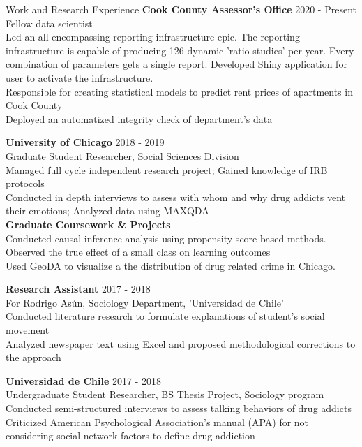 \documentclass{resume} %
\begin{document}
\begin{rSection}{Work and Research Experience}
{\textbf{Cook County Assessor's Office}}  \hfill 2020 - Present\\
Fellow data scientist\\
Led an all-encompassing reporting infrastructure epic. The reporting infrastructure is capable of producing 126 dynamic 'ratio studies' per year. Every combination of parameters gets a single report. Developed Shiny application for user to activate the infrastructure.\\
Responsible for creating statistical models to predict rent prices of apartments in Cook County\\
Deployed an automatized integrity check of department's data

{\textbf{University of Chicago}}  \hfill 2018 - 2019\\
Graduate Student Researcher, Social Sciences Division\\
Managed full cycle independent research project; Gained knowledge of IRB protocols\\
Conducted in depth interviews to assess with whom and why drug addicts vent their emotions; Analyzed data using MAXQDA\\
\textbf{Graduate Coursework \& Projects}\\
Conducted causal inference analysis using propensity score based methods. Observed the true effect of a small class on learning outcomes\\
Used GeoDA to visualize a the distribution of drug related crime in Chicago.

{\textbf{Research Assistant}}  \hfill 2017 - 2018\\
For Rodrigo Asún, Sociology Department, 'Universidad de Chile'\\
Conducted literature research to formulate explanations of student’s social movement\\
Analyzed newspaper text using Excel and proposed methodological corrections to the approach

{\textbf{Universidad de Chile}}  \hfill 2017 - 2018\\
Undergraduate Student Researcher, BS Thesis Project, Sociology program\\
Conducted semi-structured interviews to assess talking behaviors of drug addicts\\
Criticized American Psychological Association’s manual (APA) for not considering social network factors to define drug addiction

\end{rSection}
\end{document}
